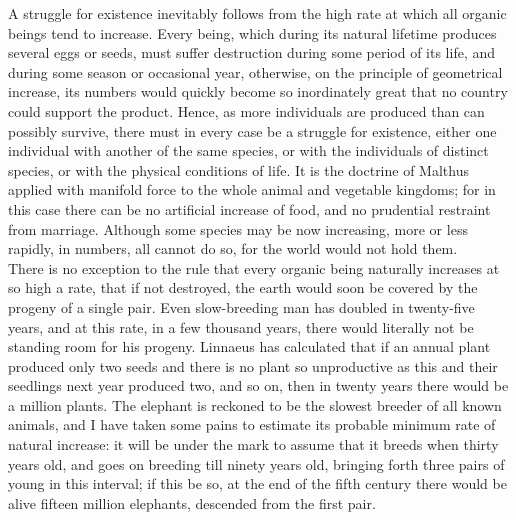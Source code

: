 \indent A struggle for existence inevitably follows from the high rate at which all organic beings tend to increase. Every being, which during its natural lifetime produces several eggs or seeds, must suffer destruction during some period of its life, and during some season or occasional year, otherwise, on the principle of geometrical increase, its numbers would quickly become so inordinately great that no country could support the product. Hence, as more individuals are produced than can possibly survive, there must in every case be a struggle for existence, either one individual with another of the same species, or with the individuals of distinct species, or with the physical conditions of life. It is the doctrine of Malthus applied with manifold force to the whole animal and vegetable kingdoms; for in this case there can be no artificial increase of food, and no prudential restraint from marriage. Although some species may be now increasing, more or less rapidly, in numbers, all cannot do so, for the world would not hold them.\\
\indent There is no exception to the rule that every organic being naturally increases at so high a rate, that if not destroyed, the earth would soon be covered by the progeny of a single pair. Even slow-breeding man has doubled in twenty-five years, and at this rate, in a few thousand years, there would literally not be standing room for his progeny. Linnaeus has calculated that if an annual plant produced only two seeds and there is no plant so unproductive as this and their seedlings next year produced two, and so on, then in twenty years there would be a million plants. The elephant is reckoned to be the slowest breeder of all known animals, and I have taken some pains to estimate its probable minimum rate of natural increase: it will be under the mark to assume that it breeds when thirty years old, and goes on breeding till ninety years old, bringing forth three pairs of young in this interval; if this be so, at the end of the fifth century there would be alive fifteen million elephants, descended from the first pair.\\
